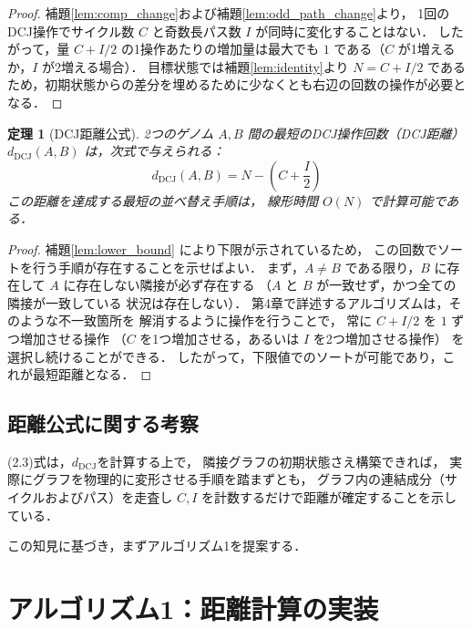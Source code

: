 \documentclass[paper=a4,fontsize=11pt,report,oneside]{jlreq}
\newtheorem{theorem}{定理}[chapter]
\begin{document}
\begin{proof}
補題\ref{lem:comp_change}および補題\ref{lem:odd_path_change}より，
1回のDCJ操作でサイクル数 $C$ と奇数長パス数 $I$ が同時に変化することはない．
したがって，量 $C + I/2$ の1操作あたりの増加量は最大でも $1$ である（$C$ が1増えるか，$I$ が2増える場合）．
目標状態では補題\ref{lem:identity}より $N = C + I/2$ であるため，初期状態からの差分を埋めるために少なくとも右辺の回数の操作が必要となる．
\end{proof}

\begin{theorem}[DCJ距離公式]
\label{thm:dcj_distance}
2つのゲノム $A, B$ 間の最短のDCJ操作回数（DCJ距離）
$d_{\mathrm{DCJ}}(A,B)$ は，次式で与えられる：
\begin{equation}
    d_{\mathrm{DCJ}}(A,B) = N - \left( C + \frac{I}{2} \right)
\end{equation}
この距離を達成する最短の並べ替え手順は，
線形時間 $O(N)$ で計算可能である．
\end{theorem}

\begin{proof}
補題\ref{lem:lower_bound} により下限が示されているため，
この回数でソートを行う手順が存在することを示せばよい．
まず，$A \neq B$ である限り，$B$ に存在して
$A$ に存在しない隣接が必ず存在する
（\because $A$ と $B$ が一致せず，かつ全ての隣接が一致している
状況は存在しない）．
第4章で詳述するアルゴリズムは，そのような不一致箇所を
解消するように操作を行うことで，
常に $C + I/2$ を $1$ ずつ増加させる操作
（$C$ を1つ増加させる，あるいは $I$ を2つ増加させる操作）
を選択し続けることができる．
したがって，下限値でのソートが可能であり，これが最短距離となる．
\end{proof}

\section{距離公式に関する考察}
(2.3)式は，$d_{\mathrm{DCJ}}$を計算する上で，
隣接グラフの初期状態さえ構築できれば，
実際にグラフを物理的に変形させる手順を踏まずとも，
グラフ内の連結成分（サイクルおよびパス）を走査し
$C, I$ を計数するだけで距離が確定することを示している．

この知見に基づき，まずアルゴリズム1を提案する．



\chapter{アルゴリズム1：距離計算の実装}
\end{document}
